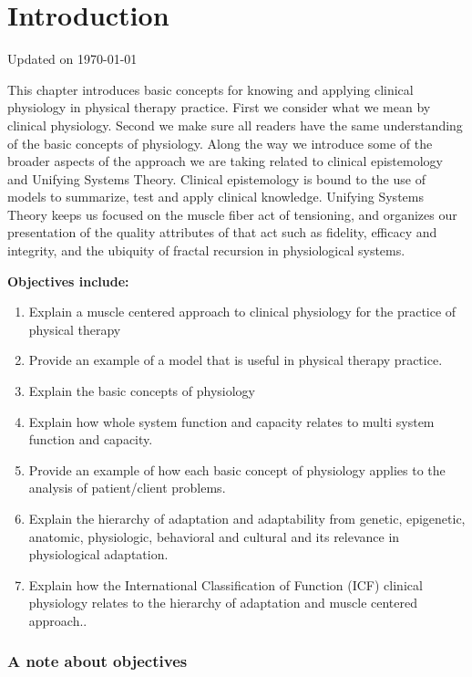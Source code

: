 \chapter*{Introduction}
Updated on \today
\minitoc


This chapter introduces basic concepts for knowing and applying clinical physiology in physical therapy practice. First we consider what we mean by clinical physiology. Second we make sure all readers have the same understanding of the basic concepts of physiology. Along the way we introduce some of the broader aspects of the approach we are taking related to clinical epistemology and Unifying Systems Theory. Clinical epistemology is bound to the use of models to summarize, test and apply clinical knowledge. Unifying Systems Theory keeps us focused on the muscle fiber act of tensioning, and organizes our presentation of the quality attributes of that act such as fidelity, efficacy and integrity, and the ubiquity of fractal recursion in physiological systems. 

\vspace{5mm}

\textbf{Objectives include:}
\begin{enumerate}
    \item Explain a muscle centered approach to clinical physiology for the practice of physical therapy
    \item Provide an example of a model that is useful in physical therapy practice.
    \item Explain the basic concepts of physiology
    \item Explain how whole system function and capacity relates to multi system function and capacity. 
    \item Provide an example of how each basic concept of physiology applies to the analysis of patient/client problems.
    \item Explain the hierarchy of adaptation and adaptability from genetic, epigenetic, anatomic, physiologic, behavioral and cultural and its relevance in physiological adaptation.
    \item Explain how the International Classification of Function (ICF) clinical physiology relates to the hierarchy of adaptation and muscle centered approach..
\end{enumerate}

\subsection{A note about objectives}

